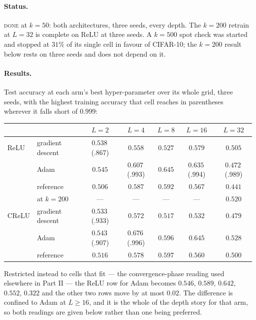 \documentclass{article} %
\theoremstyle{plain}
\theoremstyle{definition}
\theoremstyle{remark}
\begin{document}
\paragraph{Status.} \textsc{done} at $k = 50$: both architectures, three seeds, every depth. The
$k = 200$ retrain at $L = 32$ is complete on ReLU at three seeds. A $k = 500$ spot check was
started and stopped at $31\%$ of its single cell in favour of CIFAR-10; the $k = 200$ result below
rests on three seeds and does not depend on it.

\paragraph{Results.} Test accuracy at each arm's best hyper-parameter over its whole grid, three
seeds, with the highest training accuracy that cell reaches in parentheses wherever it falls short
of $0.999$:

\begin{center}\small
\begin{tabular}{llccccc}
\toprule
 & & $L=2$ & $L=4$ & $L=8$ & $L=16$ & $L=32$ \\
\midrule
ReLU  & gradient descent & $0.538$\,{\scriptsize(.867)} & $0.558$ & $0.527$ & $\mathbf{0.579}$ & $0.505$ \\
      & Adam             & $\mathbf{0.545}$ & $0.607$\,{\scriptsize(.993)} & $\mathbf{0.645}$ & $0.635$\,{\scriptsize(.994)} & $0.472$\,{\scriptsize(.989)} \\
      & reference        & $0.506$ & $\mathbf{0.587}$ & $0.592$ & $0.567$ & $0.441$ \\
      & \; at $k = 200$  & ---     & ---     & ---     & ---     & $\mathbf{0.520}$ \\
\midrule
CReLU & gradient descent & $0.533$\,{\scriptsize(.933)} & $0.572$ & $0.517$ & $0.532$ & $0.479$ \\
      & Adam             & $\mathbf{0.543}$\,{\scriptsize(.907)} & $\mathbf{0.676}$\,{\scriptsize(.996)} & $0.596$ & $\mathbf{0.645}$ & $\mathbf{0.528}$ \\
      & reference        & $0.516$ & $0.578$ & $\mathbf{0.597}$ & $0.560$ & $0.500$ \\
\bottomrule
\end{tabular}
\end{center}

\noindent Restricted instead to cells that fit --- the convergence-phase reading used elsewhere in
Part II --- the ReLU row for Adam becomes $0.546$, $0.589$, $0.642$, $0.552$, $0.322$ and the other
two rows move by at most $0.02$. The difference is confined to Adam at $L \ge 16$, and it is the
whole of the depth story for that arm, so both readings are given below rather than one being
preferred.
\end{document}
